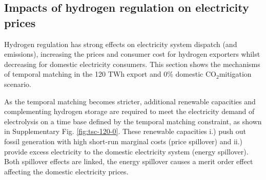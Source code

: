 \documentclass[5p,numafflabel]{elsarticle}
\newcommand{\co}{\ce{CO2}~}
\def\co{CO${}_2${\:}}
\begin{document}





\subsection*{Impacts of hydrogen regulation on electricity prices}
\label{subsec:benefits_rule}

Hydrogen regulation has strong effects on electricity system dispatch (and emissions), increasing the prices and consumer cost for hydrogen exporters whilst decreasing for domestic electricity consumers. This section shows the mechanisms of temporal matching in the 120 TWh export and 0\% domestic \co mitigation scenario.

As the temporal matching becomes stricter, additional renewable capacities and complementing hydrogen storage are required to meet the electricity demand of electrolysis
on a time base defined by the temporal matching constraint, as shown in Supplementary Fig. \ref{fig:tsc-120-0}. These renewable capacities i.) push out fossil generation with high short-run marginal costs (price spillover) and ii.) provide excess electricity to the domestic electricity system (energy spillover). Both spillover effects are linked, the energy spillover causes a merit order effect affecting the domestic electricity prices.
\end{document}
